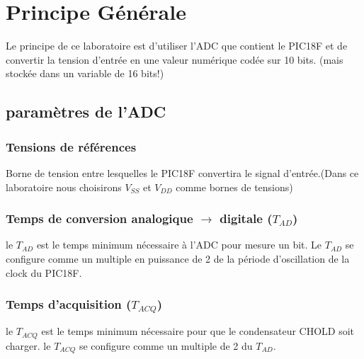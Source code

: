 \section{Principe Générale}
Le principe de ce laboratoire est d'utiliser l'ADC que contient le PIC18F et de convertir la tension d'entrée en une valeur numérique codée sur 10 bits. (mais stockée dans un variable de 16 bits!)

\subsection{paramètres de l'ADC}

\subsubsection*{Tensions de références}
Borne de tension entre lesquelles le PIC18F convertira le signal d'entrée.(Dans ce laboratoire nous choisirons  $V_{SS}$ et $V_{DD}$ comme bornes de tensions)
\subsubsection*{Temps de conversion analogique $\rightarrow$ digitale  ($T_{AD}$)}
le $T_{AD}$  est le temps minimum nécessaire à l'ADC pour mesure un bit. Le $T_{AD}$ se configure comme un multiple en puissance de 2 de la période d'oscillation de la clock du PIC18F.
\subsubsection*{Temps d'acquisition ($T_{ACQ}$)}
le $T_{ACQ}$ est le temps minimum nécessaire pour que le condensateur CHOLD soit charger. le $T_{ACQ}$  se configure comme un multiple de 2 du $T_{AD}$. 
 